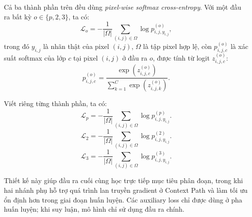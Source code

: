 Cả ba thành phần trên đều dùng \emph{pixel-wise softmax cross-entropy}. Với một đầu ra bất kỳ $o \in \{p,2,3\}$, ta có:
\[
\mathcal{L}_{o}
=
-\frac{1}{|\Omega|}
\sum_{(i,j)\in\Omega}
\log p^{(o)}_{i,j,y_{i,j}},
\]
trong đó $y_{i,j}$ là nhãn thật của pixel $(i,j)$, $\Omega$ là tập pixel hợp lệ, còn $p^{(o)}_{i,j,c}$ là xác suất softmax của lớp $c$ tại pixel $(i,j)$ ở đầu ra $o$, được tính từ logit $z^{(o)}_{i,j,c}$:
\[
p^{(o)}_{i,j,c}
=
\frac{\exp(z^{(o)}_{i,j,c})}
{\sum_{k=1}^{C}\exp(z^{(o)}_{i,j,k})}.
\]

Viết riêng từng thành phần, ta có:
\[
\mathcal{L}_{p}
=
-\frac{1}{|\Omega|}
\sum_{(i,j)\in\Omega}
\log p^{(p)}_{i,j,y_{i,j}}.
\]
\[
\mathcal{L}_{2}
=
-\frac{1}{|\Omega|}
\sum_{(i,j)\in\Omega}
\log p^{(2)}_{i,j,y_{i,j}}.
\]
\[
\mathcal{L}_{3}
=
-\frac{1}{|\Omega|}
\sum_{(i,j)\in\Omega}
\log p^{(3)}_{i,j,y_{i,j}}.
\]

Thiết kế này giúp đầu ra cuối cùng học trực tiếp mục tiêu phân đoạn, trong khi hai nhánh phụ hỗ trợ quá trình lan truyền gradient ở Context Path và làm tối ưu ổn định hơn trong giai đoạn huấn luyện. Các auxiliary loss chỉ được dùng ở pha huấn luyện; khi suy luận, mô hình chỉ sử dụng đầu ra chính.

